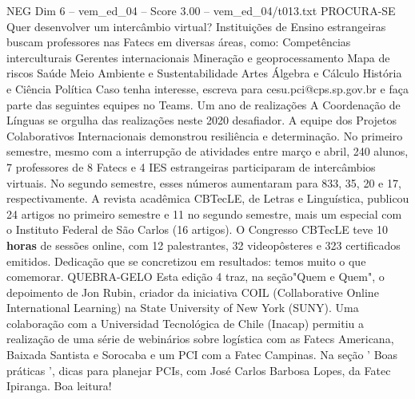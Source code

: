 \begin{textsample}{NEG Dim 6 – vem\_ed\_04 – Score 3.00 – vem\_ed\_04/t013.txt}  \label{ex:f6_neg_024}
PROCURA-SE Quer desenvolver um intercâmbio virtual?
Instituições de Ensino estrangeiras buscam professores nas Fatecs em diversas áreas, como: Competências interculturais Gerentes internacionais Mineração e geoprocessamento Mapa de riscos Saúde Meio Ambiente e Sustentabilidade Artes Álgebra e Cálculo História e Ciência Política Caso tenha interesse, escreva para cesu.pci@cps.sp.gov.br e faça parte das seguintes equipes no Teams.
Um ano de realizações A Coordenação de Línguas se orgulha das realizações neste 2020 desafiador.
A equipe dos Projetos Colaborativos Internacionais demonstrou resiliência e determinação.
No primeiro semestre, mesmo com a interrupção de atividades entre março e abril, 240 alunos, 7 professores de 8 Fatecs e 4 IES estrangeiras participaram de intercâmbios virtuais.
No segundo semestre, esses números aumentaram para 833, 35, 20 e 17, respectivamente.
A revista acadêmica CBTecLE, de Letras e Linguística, publicou 24 artigos no primeiro semestre e 11 no segundo semestre, mais um especial com o Instituto Federal de São Carlos (16 artigos).
O Congresso CBTecLE teve 10 \textbf{horas} de sessões online, com 12 palestrantes, 32 videopôsteres e 323 certificados emitidos.
Dedicação que se concretizou em resultados: temos muito o que comemorar.
QUEBRA-GELO Esta edição 4 traz, na seção"Quem e Quem", o depoimento de Jon Rubin, criador da iniciativa COIL (Collaborative Online International Learning) na State University of New York (SUNY).
Uma colaboração com a Universidad Tecnológica de Chile (Inacap) permitiu a realização de uma série de webinários sobre logística com as Fatecs Americana, Baixada Santista e Sorocaba e um PCI com a Fatec Campinas.
Na seção ' Boas práticas ', dicas para planejar PCIs, com José Carlos Barbosa Lopes, da Fatec Ipiranga.
Boa leitura!

\end{textsample}
